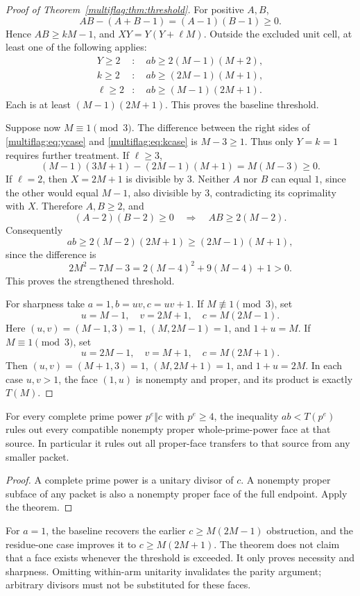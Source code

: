 \begin{proof}[Proof of Theorem~\ref{multiflag:thm:threshold}]
For positive \(A,B\),
\[
 AB-(A+B-1)=(A-1)(B-1)\ge0.
\]
Hence \(AB\ge kM-1\), and \(XY=Y(Y+\ell M)\). Outside the excluded unit cell, at least one of the following applies:
\begin{align}
 Y\ge2&:\quad ab\ge2(M-1)(M+2),\label{multiflag:eq:ycase}\\
 k\ge2&:\quad ab\ge(2M-1)(M+1),\label{multiflag:eq:kcase}\\
 \ell\ge2&:\quad ab\ge(M-1)(2M+1).\label{multiflag:eq:lcase}
\end{align}
Each is at least \((M-1)(2M+1)\). This proves the baseline threshold.

Suppose now \(M\equiv1\pmod3\). The difference between the right sides of \eqref{multiflag:eq:ycase} and \eqref{multiflag:eq:kcase} is \(M-3\ge1\). Thus only \(Y=k=1\) requires further treatment. If \(\ell\ge3\),
\[
 (M-1)(3M+1)-(2M-1)(M+1)=M(M-3)\ge0.
\]
If \(\ell=2\), then \(X=2M+1\) is divisible by \(3\). Neither \(A\) nor \(B\) can equal \(1\), since the other would equal \(M-1\), also divisible by \(3\), contradicting its coprimality with \(X\). Therefore \(A,B\ge2\), and
\[
 (A-2)(B-2)\ge0\quad\Longrightarrow\quad AB\ge2(M-2).
\]
Consequently
\[
 ab\ge2(M-2)(2M+1)\ge(2M-1)(M+1),
\]
since the difference is
\[
 2M^2-7M-3=2(M-4)^2+9(M-4)+1>0.
\]
This proves the strengthened threshold.

For sharpness take \(a=1,b=uv,c=uv+1\). If \(M\not\equiv1\pmod3\), set
\[
 u=M-1,\quad v=2M+1,\quad c=M(2M-1).
\]
Here \((u,v)=(M-1,3)=1\), \((M,2M-1)=1\), and \(1+u=M\). If \(M\equiv1\pmod3\), set
\[
 u=2M-1,\quad v=M+1,\quad c=M(2M+1).
\]
Then \((u,v)=(M+1,3)=1\), \((M,2M+1)=1\), and \(1+u=2M\). In each case \(u,v>1\), the face \((1,u)\) is nonempty and proper, and its product is exactly \(T(M)\).
\end{proof}

\begin{corollary}\label{multiflag:cor:exclude}
For every complete prime power \(p^e\Vert c\) with \(p^e\ge4\), the inequality \(ab<T(p^e)\) rules out every compatible nonempty proper whole-prime-power face at that source. In particular it rules out all proper-face transfers to that source from any smaller packet.
\end{corollary}
\begin{proof}
A complete prime power is a unitary divisor of \(c\). A nonempty proper subface of any packet is also a nonempty proper face of the full endpoint. Apply the theorem.
\end{proof}
\begin{remark}
For \(a=1\), the baseline recovers the earlier \(c\ge M(2M-1)\) obstruction, and the residue-one case improves it to \(c\ge M(2M+1)\). The theorem does not claim that a face exists whenever the threshold is exceeded. It only proves necessity and sharpness. Omitting within-arm unitarity invalidates the parity argument; arbitrary divisors must not be substituted for these faces.
\end{remark}

